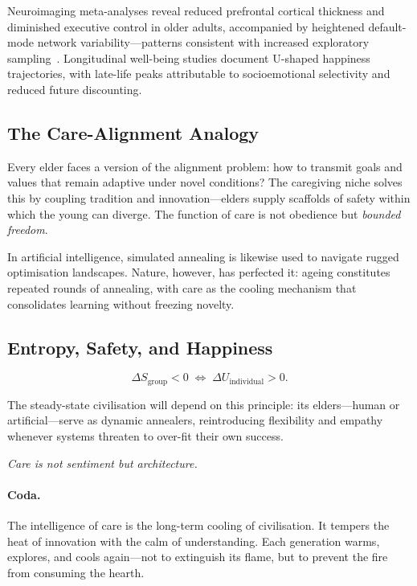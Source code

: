 \documentclass[12pt,a4paper]{article}
\theoremstyle{definition}
\begin{document}
Neuroimaging meta-analyses reveal reduced prefrontal cortical thickness and
diminished executive control in older adults, accompanied by heightened
default-mode network variability---patterns consistent with increased
exploratory sampling~\citep{carstensen2011}.  Longitudinal well-being studies
document U-shaped happiness trajectories, with late-life peaks attributable to
socioemotional selectivity and reduced future discounting.

\subsection{The Care-Alignment Analogy}

Every elder faces a version of the alignment problem: how to transmit goals
and values that remain adaptive under novel conditions?  The caregiving niche
solves this by coupling tradition and innovation---elders supply scaffolds of
safety within which the young can diverge.  The function of care is not
obedience but \emph{bounded freedom}.

In artificial intelligence, simulated annealing is likewise used to navigate
rugged optimisation landscapes.  Nature, however, has perfected it: ageing
constitutes repeated rounds of annealing, with care as the cooling mechanism
that consolidates learning without freezing novelty.

\subsection{Entropy, Safety, and Happiness}

\begin{equation}
  \Delta S_{\mathrm{group}} < 0
  \;\Longleftrightarrow\;
  \Delta U_{\mathrm{individual}} > 0.
\end{equation}

The steady-state civilisation will depend on this principle: its elders---human
or artificial---serve as dynamic annealers, reintroducing flexibility and
empathy whenever systems threaten to over-fit their own success.

\medskip
\begin{center}
  \itshape Care is not sentiment but architecture.
\end{center}

\paragraph{Coda.}
The intelligence of care is the long-term cooling of civilisation.  It tempers
the heat of innovation with the calm of understanding.  Each generation warms,
explores, and cools again---not to extinguish its flame, but to prevent the
fire from consuming the hearth.
\end{document}
